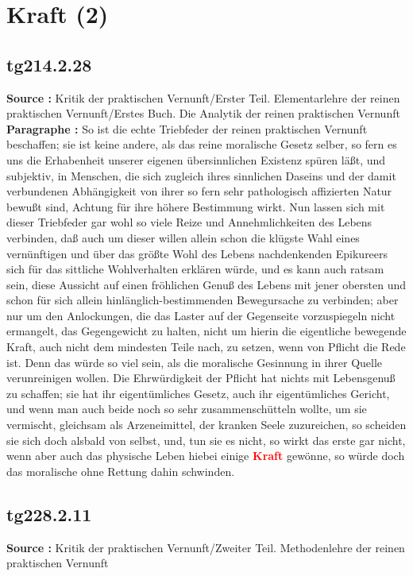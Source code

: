\documentclass[a4paper,12pt,twoside]{book}
\newcommand{\match}[1]{\textcolor{red}{\textbf{#1}}}
\newcommand{\unnumberedsection}[1]{
	\section*{#1}
	\addcontentsline{toc}{section}{#1}
	\markright{#1}
}
\begin{document}
	\unnumberedsection{Kraft (2)} 
	\subsection*{tg214.2.28} 
	\textbf{Source : }Kritik der praktischen Vernunft/Erster Teil. Elementarlehre der reinen praktischen Vernunft/Erstes Buch. Die Analytik der reinen praktischen Vernunft\\  
	
	\noindent\textbf{Paragraphe : }So ist die echte Triebfeder der reinen praktischen Vernunft beschaffen; sie ist keine andere, als das reine moralische Gesetz selber, so fern es uns die Erhabenheit unserer eigenen übersinnlichen Existenz spüren läßt, und subjektiv,  in Menschen, die sich zugleich ihres sinnlichen Daseins und der damit verbundenen Abhängigkeit von ihrer so fern sehr pathologisch affizierten Natur bewußt sind, Achtung für ihre höhere Bestimmung wirkt. Nun lassen sich mit dieser Triebfeder gar wohl so viele Reize und Annehmlichkeiten des Lebens verbinden, daß auch um dieser willen allein schon die klügste Wahl eines vernünftigen und über das größte Wohl des Lebens nachdenkenden Epikureers sich für das sittliche Wohlverhalten erklären würde, und es kann auch ratsam sein, diese Aussicht auf einen fröhlichen Genuß des Lebens mit jener obersten und schon für sich allein hinlänglich-bestimmenden Bewegursache zu verbinden; aber nur um den Anlockungen, die das Laster auf der Gegenseite vorzuspiegeln nicht ermangelt, das Gegengewicht zu halten, nicht um hierin die eigentliche bewegende Kraft, auch nicht dem mindesten Teile nach, zu setzen, wenn von Pflicht die Rede ist. Denn das würde so viel sein, als die moralische Gesinnung in ihrer Quelle verunreinigen wollen. Die Ehrwürdigkeit der Pflicht hat nichts mit Lebensgenuß zu schaffen; sie hat ihr eigentümliches Gesetz, auch ihr eigentümliches Gericht, und wenn man auch beide noch so sehr zusammenschütteln wollte, um sie vermischt, gleichsam als Arzeneimittel, der kranken Seele zuzureichen, so scheiden sie sich doch alsbald von selbst, und, tun sie es nicht, so wirkt das erste gar nicht, wenn aber auch das physische Leben hiebei einige \match{Kraft} gewönne, so würde doch das moralische ohne Rettung dahin schwinden. 
	
	\subsection*{tg228.2.11} 
	\textbf{Source : }Kritik der praktischen Vernunft/Zweiter Teil. Methodenlehre der reinen praktischen Vernunft\\  
	
\end{document}

